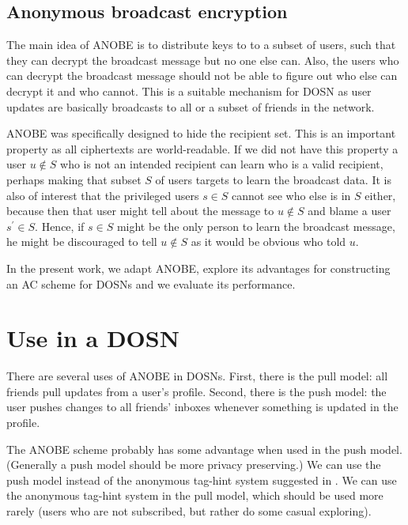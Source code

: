 \subsection{Anonymous broadcast encryption}

The main idea of \ac{ANOBE} is to distribute keys to to a subset of users, such 
that they can decrypt the broadcast message but no one else can.
Also, the users who can decrypt the broadcast message should not be able to 
figure out who else can decrypt it and who cannot.
This is a suitable mechanism for \ac{DOSN} as user updates are basically 
broadcasts to all or a subset of friends in the network.

\ac{ANOBE} was specifically designed to hide the recipient set.
This is an important property as all ciphertexts are world-readable.
If we did not have this property a user \(u\notin S\) who is not an intended 
recipient can learn who is a valid recipient, perhaps making that subset \(S\) 
of users targets to learn the broadcast data.
It is also of interest that the privileged users \(s\in S\) cannot see who else 
is in \(S\) either, because then that user might tell about the message to 
\(u\notin S\) and blame a user \(s^\prime\in S\).
Hence, if \(s\in S\) might be the only person to learn the broadcast message, 
he might be discouraged to tell \(u\notin S\) as it would be obvious who told 
\(u\).

In the present work, we adapt \ac{ANOBE}, explore its advantages for 
constructing an \ac{AC} scheme for \acp{DOSN} and we evaluate its performance.


\section{Use in a \acs{DOSN}}

There are several uses of \ac{ANOBE} in \acp{DOSN}.
First, there is the pull model: all friends pull updates from a user's profile.
Second, there is the push model: the user pushes changes to all friends' 
inboxes whenever something is updated in the profile.

The \ac{ANOBE} scheme probably has some advantage when used in the push model.
(Generally a push model should be more privacy preserving.)
We can use the push model instead of the anonymous tag-hint system suggested in 
\cite{anobe}.
We can use the anonymous tag-hint system in the pull model, which should be 
used more rarely (users who are not subscribed, but rather do some casual 
exploring).

